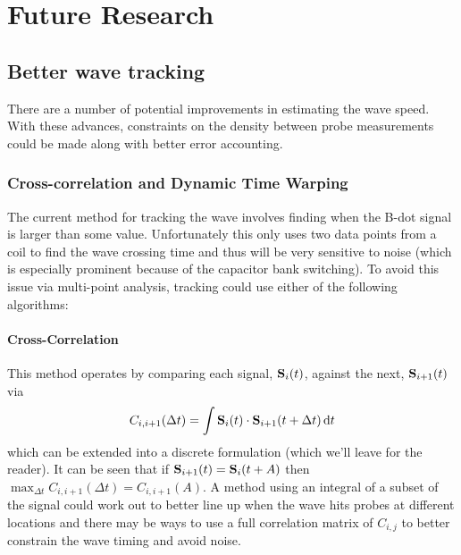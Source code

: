 


\section{Future Research}

\subsection{Better wave tracking}

There are a number of potential improvements in estimating the wave speed. With these advances, constraints on the density between probe measurements could be made along with better error accounting.

\subsubsection{Cross-correlation and Dynamic Time Warping}

The current method for tracking the wave involves finding when the B-dot signal is larger than some value. Unfortunately this only uses two data points from a coil to find the wave crossing time and thus will be very sensitive to noise (which is especially prominent because of the capacitor bank switching). To avoid this issue via multi-point analysis, tracking could use either of the following algorithms:

\paragraph{Cross-Correlation} This method operates by comparing each signal, $\vb{S}_i(t)$, against the next, $\vb{S}_{i + 1}(t)$ via
\begin{equation}
    C_{i, i + 1}(\Delta t) = \int \vb{S}_i(t) \cdot \vb{S}_{i+1}(t + \Delta t) \dd{t}
\end{equation}
which can be extended into a discrete formulation (which we'll leave for the reader). It can be seen that if $\vb{S}_{i + 1}(t) = \vb{S}_{i}(t + A)$ then $\max_{\Delta t} C_{i, i + 1}(\Delta t) = C_{i, i + 1}(A)$. A method using an integral of a subset of the signal could work out to better line up when the wave hits probes at different locations and there may be ways to use a full correlation matrix of $C_{i,j}$ to better constrain the wave timing and avoid noise.


